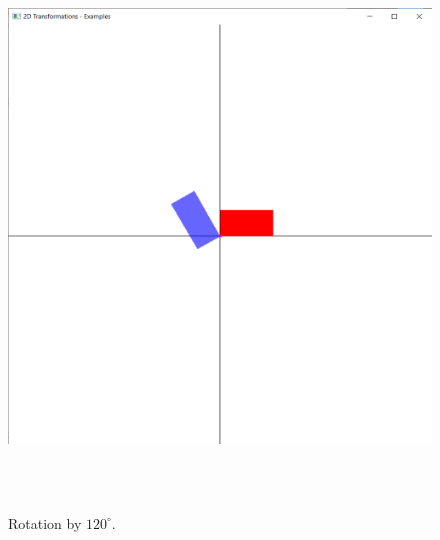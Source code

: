 \documentclass[12pt, a4]{article}
\begin{document}
\newpage
\subsection*{}
\begin{figure}[h]
\centering
\caption{Rotation by $120^{\circ}$.}
\includegraphics[height=15cm, width=15cm]{Outputs/Output-3.png}
\end{figure}

\newpage
\end{document}
